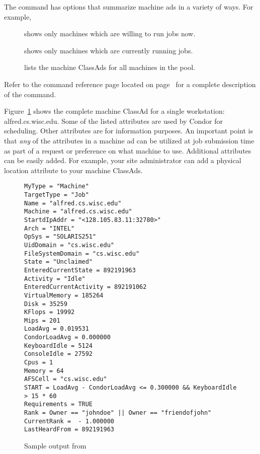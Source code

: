 The  command has options that summarize machine ads 
in a variety of ways.
For example,
\begin{description}
\item[] shows only machines which are
willing to run jobs now. 
\item[] shows only machines
which are currently running jobs.  
\item[] lists the machine ClassAds for all machines
in the pool.
\end{description}

Refer to the  command 
reference page located on page~\pageref{man-condor-status}
for a complete description of the  command.

Figure~\ref{fig:CondorStatusL} shows the complete machine ClassAd
for a single workstation: alfred.cs.wisc.edu. Some of the listed
attributes are used by
Condor for scheduling. Other attributes are for information purposes.
An important point is that \emph{any} of the attributes in a
machine ad can be utilized at job submission time as part of a request
or preference on what machine to use. Additional attributes
can be easily added. For example, your site administrator can
add a physical location attribute to your machine ClassAds.

%
%
%
\begin{center}
\begin{figure}
\small
\begin{verbatim}
MyType = "Machine"
TargetType = "Job"
Name = "alfred.cs.wisc.edu"
Machine = "alfred.cs.wisc.edu"
StartdIpAddr = "<128.105.83.11:32780>"
Arch = "INTEL"
OpSys = "SOLARIS251"
UidDomain = "cs.wisc.edu"
FileSystemDomain = "cs.wisc.edu"
State = "Unclaimed"
EnteredCurrentState = 892191963
Activity = "Idle"
EnteredCurrentActivity = 892191062
VirtualMemory = 185264
Disk = 35259
KFlops = 19992
Mips = 201
LoadAvg = 0.019531
CondorLoadAvg = 0.000000
KeyboardIdle = 5124
ConsoleIdle = 27592
Cpus = 1
Memory = 64
AFSCell = "cs.wisc.edu"
START = LoadAvg - CondorLoadAvg <= 0.300000 && KeyboardIdle > 15 * 60
Requirements = TRUE
Rank = Owner == "johndoe" || Owner == "friendofjohn" 
CurrentRank =  - 1.000000
LastHeardFrom = 892191963
\end{verbatim}
\normalsize
\caption{\label{fig:CondorStatusL}Sample output from }
\end{figure}
\end{center}


